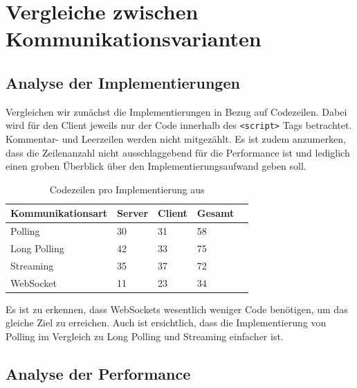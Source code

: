 \documentclass[sigplan, screen]{acmart}
\begin{document}


\section{Vergleiche zwischen Kommunikationsvarianten}

\subsection{Analyse der Implementierungen}

Vergleichen wir zunächst die Implementierungen in Bezug auf Codezeilen.
Dabei wird für den Client jeweils nur der Code innerhalb des \texttt{<script>} Tags betrachtet.
Kommentar- und Leerzeilen werden nicht mitgezählt.
Es ist zudem anzumerken, dass die Zeilenanzahl nicht ausschlaggebend für die Performance ist und lediglich einen groben Überblick über den Implementierungsaufwand geben soll.

\begin{table}[h]
  \centering
  \begin{tabular}{|l|l|l|l|l|}
    \hline
    \textbf{Kommunikationsart} & \textbf{Server} & \textbf{Client} & \textbf{Gesamt} \\ \hline
    Polling                    & 30              & 31              & 58              \\
    Long Polling               & 42              & 33              & 75              \\
    Streaming                  & 35              & 37              & 72              \\
    WebSocket                  & 11              & 23              & 34              \\ \hline
  \end{tabular}
  \caption[Codezeilen pro Implementierung]{Codezeilen pro Implementierung aus \cite{wagner_seminar2022_2022}}
  \label{tab:code-lines}
\end{table}

Es ist zu erkennen, dass WebSockets wesentlich weniger Code benötigen, um das gleiche Ziel zu erreichen.
Auch ist ersichtlich, dass die Implementierung von Polling im Vergleich zu Long Polling und Streaming einfacher ist.

\subsection{Analyse der Performance}
\end{document}
